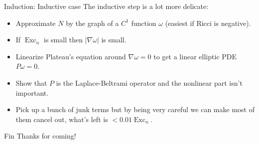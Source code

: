 \documentclass[10pt]{beamer}
\DeclareMathOperator{\Exc}{Exc}
\begin{document}
\begin{frame}{Induction: Inductive case}
The inductive step is a lot more delicate:\pause
\begin{itemize}
\item Approximate $N$ by the graph of a $C^1$ function $\omega$ (easiest if Ricci is negative). \pause
\item If $\Exc_n$ is small then $|\nabla \omega|$ is small.\pause
\item Linearize Plateau's equation around $\nabla \omega = 0$ to get a linear elliptic PDE $P\omega = 0$.\pause
\item Show that $P$ is the Laplace-Beltrami operator and the nonlinear part isn't important. \pause
\item Pick up a bunch of junk terms but by being very careful we can make most of them cancel out, what's left is $< 0.01\Exc_n$.
\end{itemize}
\end{frame}

\begin{frame}{Fin}
    Thanks for coming!
\end{frame}
\end{document}

